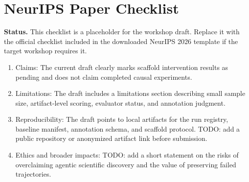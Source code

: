 \section*{NeurIPS Paper Checklist}

\textbf{Status.} This checklist is a placeholder for the workshop draft.
Replace it with the official checklist included in the downloaded NeurIPS 2026
template if the target workshop requires it.

\begin{enumerate}
\item Claims: The current draft clearly marks scaffold intervention results as
pending and does not claim completed causal experiments.
\item Limitations: The draft includes a limitations section describing small
sample size, artifact-level scoring, evaluator status, and annotation judgment.
\item Reproducibility: The draft points to local artifacts for the run registry,
baseline manifest, annotation schema, and scaffold protocol. TODO: add a public
repository or anonymized artifact link before submission.
\item Ethics and broader impacts: TODO: add a short statement on the risks of
overclaiming agentic scientific discovery and the value of preserving failed
trajectories.
\end{enumerate}
